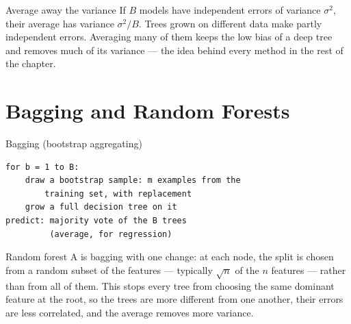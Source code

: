 \begin{keyinsight}{Average away the variance}
If $B$ models have independent errors of variance $\sigma^2$, their average has
variance $\sigma^2/B$. Trees grown on different data make partly independent
errors. Averaging many of them keeps the low bias of a deep tree and removes much
of its variance --- the idea behind every method in the rest of the chapter.
\end{keyinsight}

\section{Bagging and Random Forests}
\label{sec:forests}

\begin{algorithmbox}{Bagging (bootstrap aggregating)}
\begin{lstlisting}[style=pseudocode]
for b = 1 to B:
    draw a bootstrap sample: m examples from the
        training set, with replacement
    grow a full decision tree on it
predict: majority vote of the B trees
         (average, for regression)
\end{lstlisting}
\end{algorithmbox}

\begin{defbox}{Random forest}
A  is bagging with one change: at each node, the split is
chosen from a random subset of the features --- typically $\sqrt{n}$ of the $n$
features --- rather than from all of them. This stops every tree from choosing
the same dominant feature at the root, so the trees are more different from one
another, their errors are less correlated, and the average removes more
variance.
\end{defbox}

